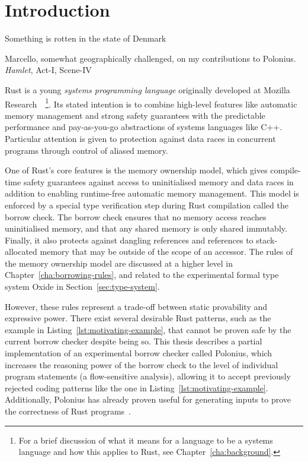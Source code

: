 \documentclass[11pt,a4paper,twoside,openany]{report}
\begin{document}
\chapter{Introduction}
\epigraph{Something is rotten in the state of Denmark}%
{Marcello, somewhat geographically challenged, on my contributions to Polonius.
  \textit{Hamlet}, Act-I, Scene-IV}
Rust is a young \textit{systems programming language} originally developed at
Mozilla Research~\cite{matsakis_rust_2014}~\footnote{For a brief discussion of
  what it means for a language to be a systems language and how this applies to
  Rust, see Chapter~\ref{cha:background}.}. Its stated intention is to combine
high-level features like automatic memory management and strong safety
guarantees with the predictable performance and pay-as-you-go abstractions of
systems languages like C++. Particular attention is given to protection against
data races in concurrent programs through control of aliased memory.

One of Rust's core features is the memory ownership model, which gives
compile-time safety guarantees against access to uninitialised memory and data
races in addition to enabling runtime-free automatic memory management. This
model is enforced by a special type verification step during Rust compilation
called the borrow check. The borrow check ensures that no memory access reaches
uninitialised memory, and that any shared memory is only shared immutably.
Finally, it also protects against dangling references and references to
stack-allocated memory that may be outside of the scope of an accessor. The
rules of the memory ownership model are discussed at a higher level in
Chapter~\ref{cha:borrowing-rules}, and related to the experimental formal type
system Oxide in Section~\ref{sec:type-system}.

However, these rules represent a trade-off between static provability and
expressive power. There exist several desirable Rust patterns, such as the
example in Listing~\ref{lst:motivating-example}, that cannot be proven safe by
the current borrow checker despite being so. This thesis describes a partial
implementation of an experimental borrow checker called Polonius, which
increases the reasoning power of the borrow check to the level of individual
program statements (a flow-sensitive analysis), allowing it to accept previously
rejected coding patterns like the one in Listing~\ref{lst:motivating-example}.
Additionally, Polonius has already proven useful for generating inputs to prove
the correctness of Rust programs~\cite{Astrauskas:2019:LRT:3366395.3360573}.
\end{document}
